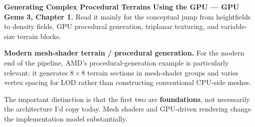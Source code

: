 \documentclass[12pt]{article}
\begin{document}
	\textbf{Generating Complex Procedural Terrains Using the GPU — GPU Gems 3, Chapter 1.}
	Read it mainly for the conceptual jump from heightfields to density fields, GPU procedural generation, triplanar texturing, and variable-size terrain blocks.
	
	\textbf{Modern mesh-shader terrain / procedural generation.}
	For the modern end of the pipeline, AMD's procedural-generation example is particularly relevant: it generates $8\times 8$ terrain sections in mesh-shader groups and varies vertex spacing for LOD rather than constructing conventional CPU-side meshes.
	
	The important distinction is that the first two are \textbf{foundations}, not necessarily the architecture I'd copy today. Mesh shaders and GPU-driven rendering change the implementation model substantially.
	
\end{document}
